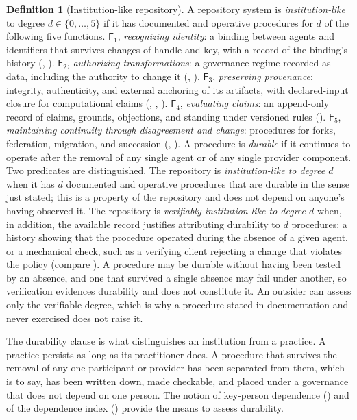 \documentclass[11pt,twoside,openright]{book}
\theoremstyle{plain}
\theoremstyle{definition}
\newtheorem{definition}[theorem]{Definition}
\theoremstyle{remark}
\begin{document}
\begin{definition}[Institution-like repository]\label{def:institutionlike}
A repository system is \emph{institution-like} to degree $d\in\{0,\dots,5\}$ if it has documented and operative procedures for $d$ of the following five functions.
$\mathsf{F}_1$, \emph{recognizing identity}: a binding between agents and identifiers that survives changes of handle and key, with a record of the binding's history (, ).
$\mathsf{F}_2$, \emph{authorizing transformations}: a governance regime recorded as data, including the authority to change it (, ).
$\mathsf{F}_3$, \emph{preserving provenance}: integrity, authenticity, and external anchoring of its artifacts, with declared-input closure for computational claims (, , ).
$\mathsf{F}_4$, \emph{evaluating claims}: an append-only record of claims, grounds, objections, and standing under versioned rules ().
$\mathsf{F}_5$, \emph{maintaining continuity through disagreement and change}: procedures for forks, federation, migration, and succession (, ).
A procedure is \emph{durable} if it continues to operate after the removal of any single agent or of any single provider component. Two predicates are distinguished. The repository is \emph{institution-like to degree $d$} when it has $d$ documented and operative procedures that are durable in the sense just stated; this is a property of the repository and does not depend on anyone's having observed it. The repository is \emph{verifiably institution-like to degree $d$} when, in addition, the available record justifies attributing durability to $d$ procedures: a history showing that the procedure operated during the absence of a given agent, or a mechanical check, such as a verifying client rejecting a change that violates the policy (compare ). A procedure may be durable without having been tested by an absence, and one that survived a single absence may fail under another, so verification evidences durability and does not constitute it. An outsider can assess only the verifiable degree, which is why a procedure stated in documentation and never exercised does not raise it.
\end{definition}

The durability clause is what distinguishes an institution from a practice. A practice persists as long as its practitioner does. A procedure that survives the removal of any one participant or provider has been separated from them, which is to say, has been written down, made checkable, and placed under a governance that does not depend on one person. The notion of key-person dependence () and of the dependence index () provide the means to assess durability.
\end{document}
